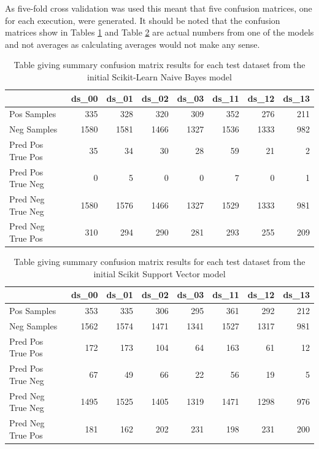 As five-fold cross validation was used this meant that five confusion matrices, one for each execution, were generated. It should be noted that the confusion matrices show in Tables \ref{tab:chapter5:nb_confusion_01} and Table \ref{tab:chapter5:sv_confusion_01} are actual numbers from one of the models and not averages as calculating averages would not make any sense.

\begin{table}[h]
	\centering
	\caption[Confusion matrices from the initial Scikit-Learn Naive Bayes model]{Table giving summary confusion matrix results for each test dataset from the initial Scikit-Learn Naive Bayes model}
	\label{tab:chapter5:nb_confusion_01}
	\begin{tabular}{lrrrrrrr}
		\toprule
		& \textbf{ds\_00}  & \textbf{ds\_01} & \textbf{ds\_02} & \textbf{ds\_03} & \textbf{ds\_11} & \textbf{ds\_12} & \textbf{ds\_13}   \\
		\midrule
		Pos Samples & 335 & 328 & 320 & 309 & 352 & 276 & 211 \\
		Neg Samples & 1580 & 1581 & 1466 & 1327 & 1536 & 1333 & 982 \\
		\midrule
		Pred Pos True Pos & 35 & 34 & 30 & 28 & 59 & 21 & 2 \\
		Pred Pos True Neg & 0 & 5 & 0 & 0 & 7 & 0 & 1 \\
		Pred Neg True Neg & 1580 & 1576 & 1466 & 1327 & 1529 & 1333 & 981 \\
		Pred Neg True Pos & 310 & 294 & 290 & 281 & 293 & 255 & 209 \\
		
		\bottomrule
    \end{tabular}
\end{table}

\begin{table}[h]
	\centering
	\caption[Confusion matrices from the initial Scikit Support Vector model]{Table giving summary confusion matrix results for each test dataset from the initial Scikit Support Vector model}
	\label{tab:chapter5:sv_confusion_01}
	\begin{tabular}{lrrrrrrr}
		\toprule
		& \textbf{ds\_00}  & \textbf{ds\_01} & \textbf{ds\_02} & \textbf{ds\_03} & \textbf{ds\_11} & \textbf{ds\_12} & \textbf{ds\_13}   \\
		\midrule
		Pos Samples & 353 & 335 & 306 & 295 & 361 & 292 & 212 \\
		Neg Samples & 1562 & 1574 & 1471 & 1341 & 1527 & 1317 & 981 \\
		\midrule
		Pred Pos True Pos & 172 & 173 & 104 & 64 & 163 & 61 & 12 \\
		Pred Pos True Neg & 67 & 49 & 66 & 22 & 56 & 19 & 5 \\
		Pred Neg True Neg & 1495 & 1525 & 1405 & 1319 & 1471 & 1298 & 976 \\
		Pred Neg True Pos & 181 & 162 & 202 & 231 & 198 & 231 & 200 \\
		
		\bottomrule
    \end{tabular}
\end{table}


